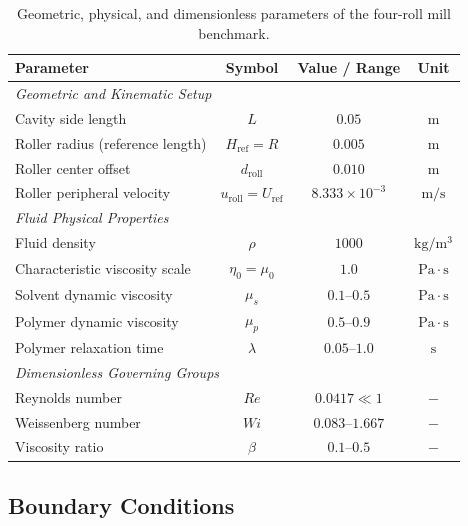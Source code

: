 \begin{table}[htbp]
    \centering
    \caption{Geometric, physical, and dimensionless parameters of the four-roll mill benchmark.}
    \label{tab:physical_parameters}
    \begin{tabular}{lccc}
        \hline
        \textbf{Parameter} & \textbf{Symbol} & \textbf{Value / Range} & \textbf{Unit} \\
        \hline
        \multicolumn{4}{l}{\textit{Geometric and Kinematic Setup}} \\
        Cavity side length & $L$ & $0.05$ & $\mathrm{m}$ \\
        Roller radius (reference length) & $H_{\mathrm{ref}} = R$ & $0.005$ & $\mathrm{m}$ \\
        Roller center offset & $d_{\mathrm{roll}}$ & $0.010$ & $\mathrm{m}$ \\
        Roller peripheral velocity & $u_{\mathrm{roll}} = U_{\mathrm{ref}}$ & $8.333 \times 10^{-3}$ & $\mathrm{m/s}$ \\
        \hline
        \multicolumn{4}{l}{\textit{Fluid Physical Properties}} \\
        Fluid density & $\rho$ & $1000$ & $\mathrm{kg/m^3}$ \\
        Characteristic viscosity scale & $\eta_0 = \mu_0$ & $1.0$ & $\mathrm{Pa\cdot s}$ \\
        Solvent dynamic viscosity & $\mu_s$ & $0.1\text{--}0.5$ & $\mathrm{Pa\cdot s}$ \\
        Polymer dynamic viscosity & $\mu_p$ & $0.5\text{--}0.9$ & $\mathrm{Pa\cdot s}$ \\
        Polymer relaxation time & $\lambda$ & $0.05\text{--}1.0$ & $\mathrm{s}$ \\
        \hline
        \multicolumn{4}{l}{\textit{Dimensionless Governing Groups}} \\
        Reynolds number & $Re$ & $0.0417 \ll 1$ & $-$ \\
        Weissenberg number & $Wi$ & $0.083\text{--}1.667$ & $-$ \\
        Viscosity ratio & $\beta$ & $0.1\text{--}0.5$ & $-$ \\
        \hline
    \end{tabular}
\end{table}

\subsection{Boundary Conditions}
\label{subsec:boundary_conditions}


